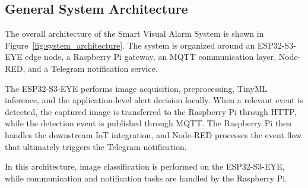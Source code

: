 \documentclass{article}
\begin{document}
\subsection{General System Architecture}
\label{subsec:general-architecture}

The overall architecture of the Smart Visual Alarm System is shown in
Figure~\ref{fig:system_architecture}. The system is organized around an
ESP32-S3-EYE edge node, a Raspberry Pi gateway, an MQTT communication layer,
Node-RED, and a Telegram notification service.

The ESP32-S3-EYE performs image acquisition, preprocessing, TinyML inference,
and the application-level alert decision locally. When a relevant event is
detected, the captured image is transferred to the Raspberry Pi through HTTP,
while the detection event is published through MQTT. The Raspberry Pi then
handles the downstream IoT integration, and Node-RED processes the event flow
that ultimately triggers the Telegram notification.

In this architecture, image classification is performed on the ESP32-S3-EYE, 
while communication and notification tasks are handled by the Raspberry Pi.
\end{document}
